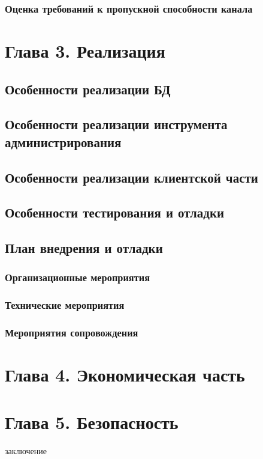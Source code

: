 \documentclass[utf8,usehyperref,12pt]{G7-32}
\begin{document}
\subsection{Оценка требований к пропускной способности канала}

\chapter{Глава 3. Реализация}
\section{Особенности реализации БД}
\section{Особенности реализации инструмента администрирования}
\section{Особенности реализации клиентской части}
\section{Особенности тестирования и отладки}
\section{План внедрения и отладки}
\subsection{Организационные мероприятия}
\subsection{Технические мероприятия}
\subsection{Мероприятия сопровождения}

\chapter{Глава 4. Экономическая часть}
\chapter{Глава 5. Безопасность}

\Conclusion
заключение
\end{document}
